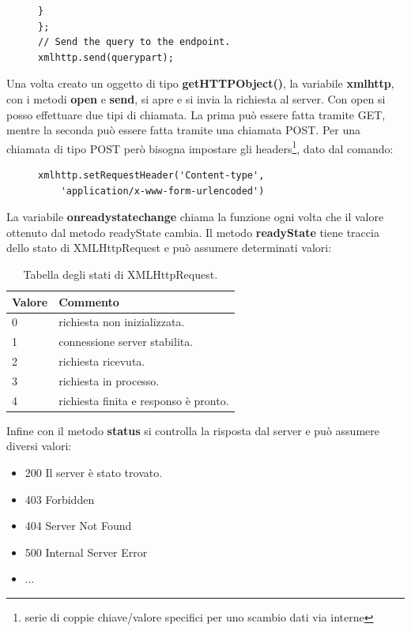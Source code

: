 \documentclass[a4paper,11pt]{article}
\begin{document}
\begin{enumerate}
\begin{enumerate}[label*=\arabic*.]
\begin{figure}[htb]
\begin{lstlisting}[language=HTML, basicstyle=\large]
 }	
};
// Send the query to the endpoint.
xmlhttp.send(querypart);
\end{lstlisting}
\end{figure}\newline
Una volta creato un oggetto di tipo \textbf{getHTTPObject()}, la variabile \textbf{xmlhttp}, con i metodi \textbf{open} e \textbf{send}, si apre e si invia la richiesta al server.\newline
Con open si posso effettuare due tipi di chiamata. La prima può essere fatta tramite GET, mentre la seconda può essere fatta tramite una chiamata POST. Per una chiamata di tipo POST però bisogna impostare gli headers\footnote{serie di coppie chiave/valore specifici per uno scambio dati via interne}, dato dal comando:
\begin{figure}[htb]
\begin{lstlisting}[language=HTML, basicstyle=\large]
xmlhttp.setRequestHeader('Content-type',
	'application/x-www-form-urlencoded')
\end{lstlisting}
\end{figure}\newline
La variabile \textbf{onreadystatechange} chiama la funzione ogni volta che il valore ottenuto dal metodo readyState cambia.
Il metodo \textbf{readyState} tiene traccia dello stato di XMLHttpRequest e può assumere determinati valori:
	\begin{table}
		\begin{center}				
		\begin{tabular}{|>{\small}l|>{\small}l|}
				\hline
				\textbf{Valore} & \textbf{Commento}\\				
				\hline
				0 & richiesta non inizializzata.\\
				\hline
				1 & connessione server stabilita.\\
				\hline
				2 & richiesta ricevuta.\\
				\hline
				3 & richiesta in processo.\\
				\hline
				4 & richiesta finita e responso è pronto.\\
				\hline			
		\end{tabular}	
		\caption{Tabella degli stati di XMLHttpRequest.}	
		\end{center}	
	\end{table}\newpage
Infine con il metodo \textbf{status} si controlla la risposta dal server e può  assumere diversi valori:
\begin{itemize}
	\item 200 Il server è stato trovato.
	\item 403 Forbidden
	\item 404 Server Not Found	
	\item 500 Internal Server Error
	\item ...
\end{itemize}
	


\end{enumerate}
\end{enumerate}
\end{document}
